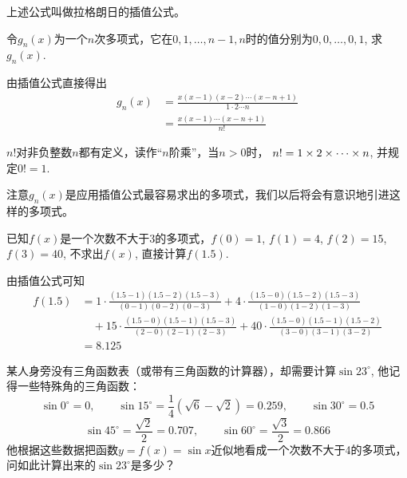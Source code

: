 上述公式叫做拉格朗日的插值公式。

\begin{example}
   令$g_n(x)$为一个$n$次多项式，它在$0, 1,\ldots,n-1,n $时的值分别为$0, 0,\ldots,0, 1$, 求$g_n(x)$. 
\end{example}

\begin{solution}
    由插值公式直接得出
    \[\begin{split}
        g_n(x)&=\frac{x(x-1)(x-2)\cdots(x-n+1)}{1\cdot 2\cdots n}\\
        &=\frac{x(x-1)\cdots(x-n+1)}{n!}      
    \end{split}\]

$n!$对非负整数$n$都有定义，读作“$n$阶乘”，当$n>0$时，
$n!=1\times2\times\cdots \times n$, 并规定$0!=1$.

注意$g_n(x)$是应用插值公式最容易求出的多项式，我们以后将会有意识地引进这样的多项式。
\end{solution}

\begin{example}
    已知$f(x)$是一个次数不大于3的多项式，$f(0)=1$, $f(1)=4$, $f(2)=15$, $f(3)=40$, 不求出$f(x)$, 直接计算$f(1.5)$.
\end{example}

\begin{solution}
    由插值公式可知
    \[\begin{split}
         f (1. 5) &=1\cdot \frac{(1. 5-1) (1.5-2)(1.5-3)}{(0-1) (0-2)(0-3)}+4\cdot \frac{(1.5-0)(1.5-2)(1.5-3)}{(1-0) (1-2)(1-3)}\\
         &\quad +15\cdot \frac{(1. 5-0) (1.5-1)(1.5-3)}{(2-0) (2-1)(2-3)} +40\cdot \frac{(1. 5-0) (1.5-1)(1.5-2)}{(3-0) (3-1)(3-2)}\\
         &=8.125
    \end{split}\]
\end{solution}
 

\begin{example}
某人身旁没有三角函数表（或带有三角函数的计算器），却需要计算$\sin23^{\circ}$, 他记得一些特殊角的三角函数：
\[\sin0^{\circ}=0,\qquad \sin15^{\circ}=\frac{1}{4} (\sqrt{6}-\sqrt{2}) =0. 259,\qquad \sin30^{\circ}=0.5\]
\[\sin45^{\circ}=\frac{\sqrt{2}}{2}=0. 707,\qquad \sin60^{\circ}=\frac{\sqrt{3}}{2}=0.866\]
他根据这些数据把函数$y=f(x)=\sin x$近似地看成一个次数不大于4的多项式，问如此计算出来的$\sin23^{\circ}$是多少？
\end{example}

